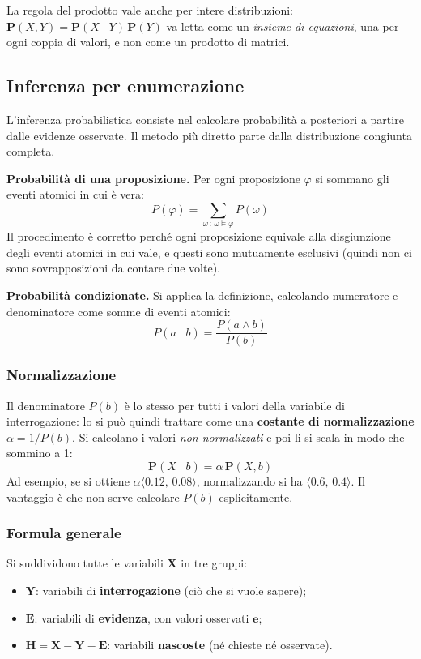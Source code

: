 \documentclass[11pt, a4paper]{article}
\renewcommand{\emph}[1]{\textcolor{verdechiaro}{\itshape #1}}
\newcommand{\Pv}{\mathbf{P}}               %
\newcommand{\tup}[1]{\langle #1 \rangle}    %
\begin{document}
La regola del prodotto vale anche per intere distribuzioni: $\Pv(X, Y) = \Pv(X \mid Y)\,\Pv(Y)$ va letta come un \emph{insieme di equazioni}, una per ogni coppia di valori, e non come un prodotto di matrici.

\subsection{Inferenza per enumerazione}

L'inferenza probabilistica consiste nel calcolare probabilità a posteriori a partire dalle evidenze osservate. Il metodo più diretto parte dalla distribuzione congiunta completa.

\textbf{Probabilità di una proposizione.} Per ogni proposizione $\varphi$ si sommano gli eventi atomici in cui è vera:
\[
  P(\varphi) = \sum_{\omega \,:\, \omega \models \varphi} P(\omega)
\]
Il procedimento è corretto perché ogni proposizione equivale alla disgiunzione degli eventi atomici in cui vale, e questi sono mutuamente esclusivi (quindi non ci sono sovrapposizioni da contare due volte).

\textbf{Probabilità condizionate.} Si applica la definizione, calcolando numeratore e denominatore come somme di eventi atomici:
\[
  P(a \mid b) = \frac{P(a \land b)}{P(b)}
\]

\subsubsection*{Normalizzazione}

Il denominatore $P(b)$ è lo stesso per tutti i valori della variabile di interrogazione: lo si può quindi trattare come una \textbf{costante di normalizzazione} $\alpha = 1/P(b)$. Si calcolano i valori \emph{non normalizzati} e poi li si scala in modo che sommino a 1:
\[
  \Pv(X \mid b) = \alpha\, \Pv(X, b)
\]
Ad esempio, se si ottiene $\alpha\tup{0.12,\, 0.08}$, normalizzando si ha $\tup{0.6,\, 0.4}$. Il vantaggio è che non serve calcolare $P(b)$ esplicitamente.

\subsubsection*{Formula generale}

Si suddividono tutte le variabili $\mathbf{X}$ in tre gruppi:
\begin{itemize}
  \item $\mathbf{Y}$: variabili di \textbf{interrogazione} (ciò che si vuole sapere);
  \item $\mathbf{E}$: variabili di \textbf{evidenza}, con valori osservati $\mathbf{e}$;
  \item $\mathbf{H} = \mathbf{X} - \mathbf{Y} - \mathbf{E}$: variabili \textbf{nascoste} (né chieste né osservate).
\end{itemize}
\end{document}

